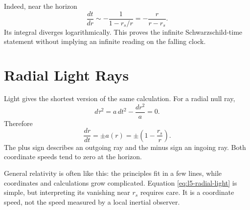 \begin{classroomqa}
\end{classroomqa}

Indeed, near the horizon
\begin{equation}
\frac{dt}{dr}
\sim-\frac{1}{1-r_s/r}
=-\frac{r}{r-r_s}.
\end{equation}
Its integral diverges logarithmically.  This proves the infinite
Schwarzschild-time statement without implying an infinite reading on the
falling clock.

\section{Radial Light Rays}

Light gives the shortest version of the same calculation.  For a radial null
ray,
\begin{equation}
d\tau^2
=a\,dt^2-\frac{dr^2}{a}=0.
\end{equation}
Therefore
\begin{equation}
\boxed{
\frac{dr}{dt}
=\pm a(r)
=\pm\left(1-\frac{r_s}{r}\right).
}
\label{eq:l5-radial-light}
\end{equation}
The plus sign describes an outgoing ray and the minus sign an ingoing ray.
Both coordinate speeds tend to zero at the horizon.

\begin{classroomqa}
\end{classroomqa}

General relativity is often like this: the principles fit in a few lines,
while coordinates and calculations grow complicated.  Equation
\eqref{eq:l5-radial-light} is simple, but interpreting its vanishing near
\(r_s\) requires care.  It is a coordinate speed, not the speed measured by a
local inertial observer.

